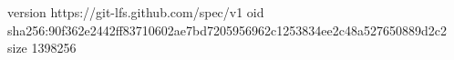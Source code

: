 version https://git-lfs.github.com/spec/v1
oid sha256:90f362e2442ff83710602ae7bd7205956962c1253834ee2c48a527650889d2c2
size 1398256
